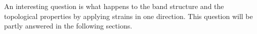 	An interesting question is what happens to the band structure and the topological properties by applying strains in one direction. This question will be partly answered in the following sections.
%
%	
%	

